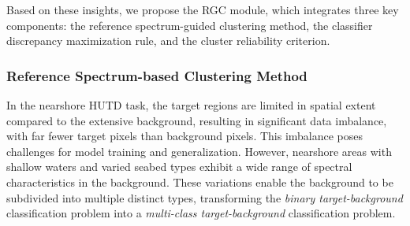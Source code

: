 Based on these insights, we propose the RGC module, which integrates three key components: the reference spectrum-guided clustering method, the classifier discrepancy maximization rule, and the cluster reliability criterion.

\subsubsection{Reference Spectrum-based Clustering Method}\label{sec3.2.1}
In the nearshore HUTD task, the target regions are limited in spatial extent compared to the extensive background, resulting in significant data imbalance, with far fewer target pixels than background pixels. 
This imbalance poses challenges for model training and generalization. 
However, nearshore areas with shallow waters and varied seabed types exhibit a wide range of spectral characteristics in the background. 
These variations enable the background to be subdivided into multiple distinct types, transforming the \emph{binary target-background} classification problem into a \emph{multi-class target-background} classification problem.

